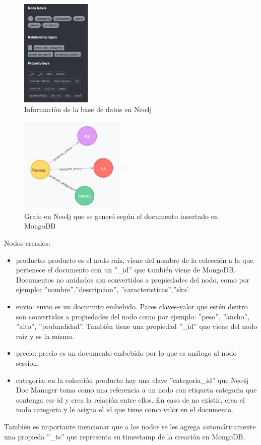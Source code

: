 \documentclass[conference]{IEEEtran}
\begin{document}
\begin{figure}[!h]
\centering
\includegraphics[width=0.3\textwidth]{11}
\caption{Informaci\'on de la base de datos en Neo4j}
\label{}
\end{figure}

\begin{figure}[!h]
\centering
\includegraphics[width=0.45\textwidth]{12}
\caption{Grafo en Neo4j que se gener\'o seg\'un el documento insertado en MongoDB}
\label{}
\end{figure}

Nodos creados:\\
\begin{itemize}
\item producto: producto es el nodo ra\'iz, viene del nombre de la colecci\'on a la que pertenece el documento con un  ''\_id'' que tambi\'en viene de MongoDB. Documentos no anidados son convertidos a propiedades del nodo, como por ejemplo: ''nombre'',''descripcion'', ''caracteristicas'',''sku'.
\item envio: envio es un documnto embebido. Pares claves-valor que est\'en dentro son convertidos a propiedades del nodo como por ejemplo: ''peso'', ''ancho'', ''alto'', ''profundidad''. Tambi\'en tiene una propiedad ''\_id'' que viene del nodo ra\'iz y es la mismo.
\item precio: precio es un documento embebido por lo que es análogo al nodo session.
\item categoria: en la colecci\'on producto hay una clave ''categoria\_id'' que Neo4j Doc Manager toma como una referencia a un nodo con etiqueta categoria que contenga ese id y crea la relaci\'on entre ellos. En caso de no existir, crea el nodo categoria y le asigna el id que tiene como valor en el documento.
\end{itemize}
También es importante mencionar que a los nodos se les agrega autom\'aticamente una propieda ''\_ts'' que representa su timestamp de la creaci\'on en MongoDB.\\
\end{document}
